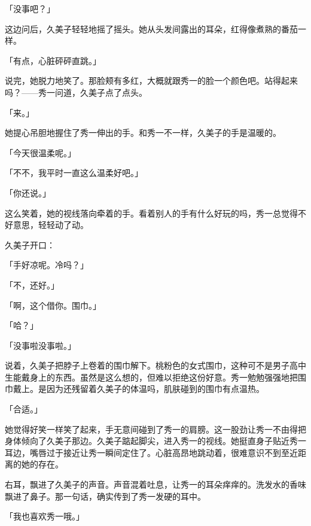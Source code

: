 \documentclass[UTF8]{ctexart}
\begin{document}
    「没事吧？」

    这边问后，久美子轻轻地摇了摇头。她从头发间露出的耳朵，红得像煮熟的番茄一样。

    「有点，心脏砰砰直跳。」

    说完，她脱力地笑了。那脸颊有多红，大概就跟秀一的脸一个颜色吧。站得起来吗？——秀一问道，久美子点了点头。

    「来。」

    她提心吊胆地握住了秀一伸出的手。和秀一不一样，久美子的手是温暖的。

    「今天很温柔呢。」

    「不不，我平时一直这么温柔好吧。」

    「你还说。」

    这么笑着，她的视线落向牵着的手。看着别人的手有什么好玩的吗，秀一总觉得不好意思，轻轻动了动。

    久美子开口：

    「手好凉呢。冷吗？」

    「不，还好。」

    「啊，这个借你。围巾。」

    「哈？」

    「没事啦没事啦。」

    说着，久美子把脖子上卷着的围巾解下。桃粉色的女式围巾，这种可不是男子高中生能戴身上的东西。虽然是这么想的，但难以拒绝这份好意。秀一勉勉强强地把围巾戴上。是因为还残留着久美子的体温吗，肌肤碰到的围巾有点温热。

    「合适。」

    她觉得好笑一样笑了起来，手无意间碰到了秀一的肩膀。这一股劲让秀一不由得把身体倾向了久美子那边。久美子踮起脚尖，进入秀一的视线。她挺直身子贴近秀一耳边，嘴唇过于接近让秀一瞬间定住了。心脏高昂地跳动着，很难意识不到至近距离的她的存在。

    右耳，飘进了久美子的声音。声音混着吐息，让秀一的耳朵痒痒的。洗发水的香味飘进了鼻子。那一句话，确实传到了秀一发硬的耳中。

    「我也喜欢秀一哦。」
\end{document}
